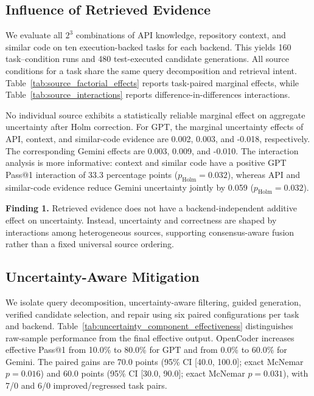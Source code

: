 \subsection{Influence of Retrieved Evidence}

We evaluate all $2^3$ combinations of API knowledge, repository context, and
similar code on ten execution-backed tasks for each backend. This yields 160
task--condition runs and 480 test-executed candidate generations. All source
conditions for a task share the same query decomposition and retrieval intent.
Table~\ref{tab:source_factorial_effects} reports task-paired marginal effects,
while Table~\ref{tab:source_interactions} reports difference-in-differences
interactions.

No individual source exhibits a statistically reliable marginal effect on
aggregate uncertainty after Holm correction. For GPT, the marginal uncertainty
effects of API, context, and similar-code evidence are
0.002,
0.003, and
-0.018,
respectively. The corresponding Gemini effects are
0.003,
0.009, and
-0.010.
The interaction analysis is more informative: context and similar code have a
positive GPT Pass@1 interaction of
33.3
percentage points ($p_{\mathrm{Holm}}=
0.032$),
whereas API and similar-code evidence reduce Gemini uncertainty jointly by
0.059
($p_{\mathrm{Holm}}=
0.032$).

\noindent\textbf{Finding 1.}
Retrieved evidence does not have a backend-independent additive effect on
uncertainty. Instead, uncertainty and correctness are shaped by interactions
among heterogeneous sources, supporting consensus-aware fusion rather than a
fixed universal source ordering.

\subsection{Uncertainty-Aware Mitigation}

We isolate query decomposition, uncertainty-aware filtering, guided generation,
verified candidate selection, and repair using six paired configurations per
task and backend. Table~\ref{tab:uncertainty_component_effectiveness}
distinguishes raw-sample performance from the final effective output.
OpenCoder increases effective Pass@1 from
10.0\% to
80.0\% for GPT and from
0.0\% to
60.0\% for Gemini. The paired gains are
70.0 points
(95\% CI [40.0, 100.0];
exact McNemar $p=0.016$) and
60.0 points
(95\% CI [30.0, 90.0];
exact McNemar $p=0.031$), with 7/0 and
6/0 improved/regressed task pairs.

